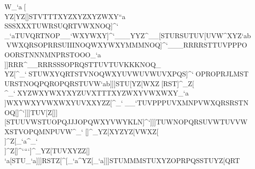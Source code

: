 W_`a                                                            ^^^[\\YZ[YZ[\]]STVTTTXYZXYZXYZWXY``a                                                            \\\YZ[YZ[VWXWXYXYZWXYWXY[\]WXYUVW\]^                                                            ^^^QQQ[\]\]]SSSXXXTUWRSUQRTVWXNOQ]^`                                                            \\\TUWRSTRST_`aTUVQRTNOP__`WXYWXY]^`                                                            ___YYZ^__[\]STURSUTUV[\]UVW\]^XYZ`ab                                                            ^^^VWXQRSOPRRSUIIINOQWXYWXYMMMNOQ]^`                                                            ___RRRRSTTUVPPPOOORSTNNNMNPRSTOOO_`a                                                            \\\MNPSTUUVWQRSTUW[\]QRTUVWUVXXYZ^_`                                                            ___^^_[\][\]WXYSTVTTTWXYXYZXYZWXY``a                                                            \\\\\]YZ[VWXWXYVWXWXYXYZ[\]UVXXYZ\]^                                                            ]]]RRR^__RRRSSSOPRQSTTUVTUVKKKNOQ\]_                                                            \\\RSTPQR[\]WXZNOQMNPVWX`aaUVWUVX^_`                                                            ^^^RSU\]^VWXOPQUVWYZ[YZ[YZ[[[]YZ[^_`                                                            ^^^STUWXYQRTSTVNOQWXYUVWUVWUVXPQS]^`                                                            ^^^OPROPRJLMSTURSTNOQPQROPQRSTUVW`ab                                                            ]]]STU[\]YZ[WXZ^^_[\]RST]^_Z[\[\]^_`                                                            ^^^XYZWXYWXYXYZUVXTTTXYZWXYVWXWXY_`a                                                            ^^^\\]WXYWXYVWXWXYUVXXYZZ[\WXYXYZ^_`                                                            ^^^__`TUVPPPUVXMNPVWXQRSRSTNOQ[\]]^`                                                            ]]]TUV[\]Z[\NNNZ[\STU_``XYZYZ[RST_`a                                                            \\\UVXZ[\UVXLLLWXYYZ[YZ[WXZWXYSTV^_`                                                            ]]][\]STUUVWSTUOPQJJJOPQWXYVWYKLN]^`                                                            ]]]TUWNOPQRSUVWTUVVWXSTVOPQMNPUVW^_`                                                            ^^^[\]]^_YZ[XYZYZ[VWXZ[\\]^Z[\_`a^_`                                                            \\\YZ[XYZWXYWXYTUVTTTXYZWXYWXYVWX_`a                                                            ^^^YZ[UVXVWXWXYWXYWXYZ[\YZ[UVWYZ[^_`                                                            ^^^^^_STU[\]]]^Z[\QRSWXZQRTMNPOQR]^`                                                            ```]^_YZ[TUVXYZZ[\XYZ]^^``a[\]STU_`a                                                            ]]]RSTZ[\STVSTVSTU\]^[\]_`a\]^YZ[_`a                                                            ]]]STUMMMSTUXYZOPRPQSSTUYZ[QRT